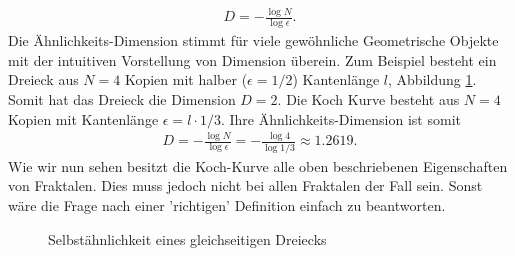 \begin{align*}
	D = - \frac{\log N}{\log \epsilon }.
\end{align*}
Die Ähnlichkeits-Dimension stimmt für viele gewöhnliche Geometrische Objekte mit der intuitiven Vorstellung von Dimension überein.
Zum Beispiel besteht ein Dreieck aus $N = 4$ Kopien mit halber ($\epsilon = 1/2$) Kantenlänge $l$, Abbildung \ref{ifs:trinagle}.
Somit hat das Dreieck die Dimension $D = 2$.
Die Koch Kurve besteht aus $N = 4$ Kopien mit Kantenlänge $\epsilon =l \cdot 1/3$.
Ihre  Ähnlichkeits-Dimension ist somit
\begin{align*}
	D = - \frac{\log N }{\log \epsilon } = - \frac{\log 4 }{\log 1/3 } \approx 1.2619.
\end{align*}
Wie wir nun sehen besitzt die Koch-Kurve alle oben beschriebenen Eigenschaften von Fraktalen. 
Dies muss jedoch nicht bei allen Fraktalen der Fall sein. Sonst wäre die Frage nach einer 'richtigen' Definition einfach zu beantworten.
\begin{figure}
	\centering
	\caption{Selbstähnlichkeit eines gleichseitigen Dreiecks}
	\label{ifs:trinagle}
\end{figure}

